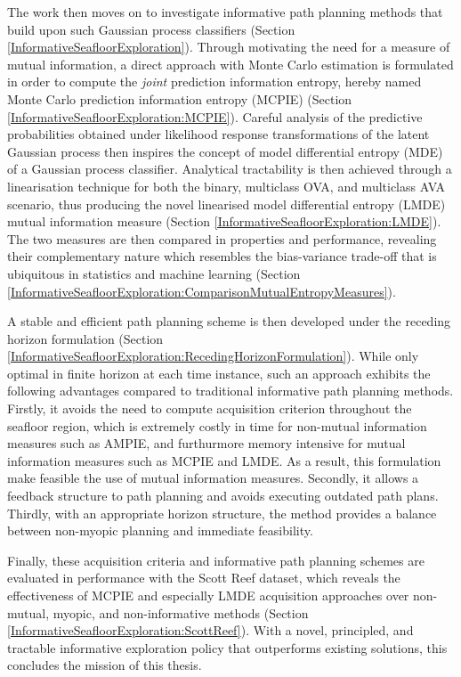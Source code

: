 		The work then moves on to investigate informative path planning methods that build upon such Gaussian process classifiers (Section \ref{InformativeSeafloorExploration}). Through motivating the need for a measure of mutual information, a direct approach with Monte Carlo estimation is formulated in order to compute the \textit{joint} prediction information entropy, hereby named Monte Carlo prediction information entropy (MCPIE) (Section \ref{InformativeSeafloorExploration:MCPIE}). Careful analysis of the predictive probabilities obtained under likelihood response transformations of the latent Gaussian process then inspires the concept of model differential entropy (MDE) of a Gaussian process classifier. Analytical tractability is then achieved through a linearisation technique for both the binary, multiclass OVA, and multiclass AVA scenario, thus producing the novel linearised model differential entropy (LMDE) mutual information measure (Section \ref{InformativeSeafloorExploration:LMDE}). The two measures are then compared in properties and performance, revealing their complementary nature which resembles the bias-variance trade-off that is ubiquitous in statistics and machine learning (Section \ref{InformativeSeafloorExploration:ComparisonMutualEntropyMeasures}).
		
		A stable and efficient path planning scheme is then developed under the receding horizon formulation (Section \ref{InformativeSeafloorExploration:RecedingHorizonFormulation}). While only optimal in finite horizon at each time instance, such an approach exhibits the following advantages compared to traditional informative path planning methods. Firstly, it avoids the need to compute acquisition criterion throughout the seafloor region, which is extremely costly in time for non-mutual information measures such as AMPIE, and furthurmore memory intensive for mutual information measures such as MCPIE and LMDE. As a result, this formulation make feasible the use of mutual information measures. Secondly, it allows a feedback structure to path planning and avoids executing outdated path plans. Thirdly, with an appropriate horizon structure, the method provides a balance between non-myopic planning and immediate feasibility.
		
		Finally, these acquisition criteria and informative path planning schemes are evaluated in performance with the Scott Reef dataset, which reveals the effectiveness of MCPIE and especially LMDE acquisition approaches over non-mutual, myopic, and non-informative methods (Section \ref{InformativeSeafloorExploration:ScottReef}). With a novel, principled, and tractable informative exploration policy that outperforms existing solutions, this concludes the mission of this thesis.
	
